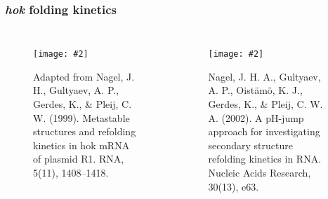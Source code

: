 \documentclass{beamer}
\newcommand{\slidefigure}[2][1]{\centering\texttt{[image: \#2]}}
\begin{document}

\begin{frame}
	\frametitle{{\em hok} folding kinetics}
	\begin{columns}
		\begin{figure}
			\slidefigure[.7]{hoktranscription} \caption{Adapted from Nagel, J. H., Gultyaev, A. P., Gerdes, K., \& Pleij, C. W. (1999). Metastable structures and refolding kinetics in hok mRNA of plasmid R1. RNA, 5(11), 1408--1418.}
		\end{figure}

		\begin{figure}
			\slidefigure{hokrefoldingkinetics} \caption{Nagel, J. H. A., Gultyaev, A. P., Oist{\"a}m{\"o}, K. J., Gerdes, K., \& Pleij, C. W. A. (2002). A pH-jump approach for investigating secondary structure refolding kinetics in RNA. Nucleic Acids Research, 30(13), e63.}
		\end{figure}
	\end{columns}
\end{frame}
\end{document}
